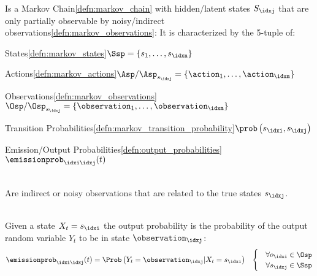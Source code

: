 \begin{defnbox}\nospacing
  \begin{defn}\label{defn:hidden_markov_model_hmm}\leavevmode\\
    Is a Markov Chain\cref{defn:markov_chain} with hidden/latent states $S_{\idxj}$ that are only partially observable
    by noisy/indirect observations\cref{defn:markov_observations}:
    It is characterized by the 5-tuple of:
    \begin{circlelistnosep}
        \item States\cref{defn:markov_states}\hfill$\Ssp=\left\{s_{1},\ldots,s_{\idxn}\right\}$
        \item Actions\cref{defn:markov_actions}\hfill$\Asp/\Asp_{s_{\idxj}}=\left\{\action_{1},\ldots,\action_{\idxm}\right\}$
        \item Observations\cref{defn:markov_observations}\hfill$\Osp/\Osp_{s_{\idxj}}=\left\{\observation_{1},\ldots,\observation_{\idxm}\right\}$
        \item Transition Probabilities\cref{defn:markov_transition_probability}\hfill$\prob\left(s_{\idxi},s_{\idxj}\right)$
        \item Emission/Output Probabilities\cref{defn:output_probabilities}\hfill$\emissionprob_{\idxi\idxj}(t)$
    \end{circlelistnosep}
        \centering{
            \resizebox{\linewidth}{!}{}
        }
  \end{defn}
\end{defnbox}
\begin{defnbox}\nospacing
  \begin{defn}[Observations\hfill\tc{black}{$\Osp=\left\{\observation_1,\ldots,\observation_{\idxl}\right\}$}]\label{defn:markov_observations}\leavevmode\\
    Are indirect or noisy observations that are related to the true states $s_{\idxj}$.
  \end{defn}
\end{defnbox}
\begin{defnbox}\nospacing
  \begin{defn}\label{defn:output_probabilities}\leavevmode\\
    Given a state $X_{t}=s_{\idxi}$ the output probability is the probability of the output random variable $Y_{t}$ to be in state $\observation_{\idxj}$:
    \begin{align}
      \emissionprob_{\idxi\idxj}(t)=\Prob\left(Y_{t}=\observation_{\idxj}|X_{t}=s_{\idxi}\right)&&
      \begin{cases}
        &\forall o_{\idxi}\in\Osp\\
        &\forall s_{\idxj}\in\Ssp
      \end{cases}\label{eq:emission_output_probability}
    \end{align}
  \end{defn}
\end{defnbox}
